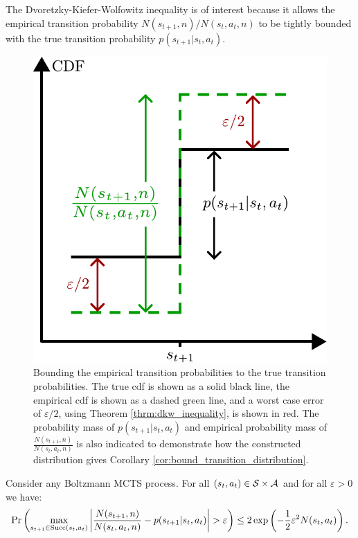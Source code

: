     The Dvoretzky-Kiefer-Wolfowitz inequality is of interest because it allows the empirical transition probability $N(s_{t+1},n)/N(s_t,a_t,n)$ to be tightly bounded with the true transition probability $p(s_{t+1}|s_t,a_t)$. 
    \begin{figure}
        \centering
        \includegraphics[scale=0.6]{figures/ch4/dkw_diagram.pdf}
        \caption[Bounding the empirical transition probabilities to the true transition probabilities.]{Bounding the empirical transition probabilities to the true transition probabilities. The true cdf is shown as a solid black line, the empirical cdf is shown as a dashed green line, and a worst case error of $\varepsilon/2$, using Theorem \ref{thrm:dkw_inequality}, is shown in red. The probability mass of $p(s_{t+1}|s_t,a_t)$ and empirical probability mass of $\frac{N(s_{t+1},n)}{N(s_t,a_t,n)}$ is also indicated to demonstrate how the constructed distribution gives Corollary \ref{cor:bound_transition_distribution}.}
        \label{fig:dkw_diag}
    \end{figure}
    \begin{corollary} \label{cor:bound_transition_distribution}
        Consider any Boltzmann MCTS process. For all $(s_t,a_t)\in\mathcal{S}\times\mathcal{A}$ and for all $\varepsilon >0$ we have:
        \begin{align}
            \Pr\left(\max_{s_{t+1}\in{\textnormal{Succ}(s_t,a_t)}}\left| \frac{N(s_{t+1},n)}{N(s_t,a_t,n)} - p(s_{t+1}|s_t,a_t) \right| > \varepsilon \right) \leq 2 \exp\left(-\frac{1}{2}\varepsilon^2 N(s_t,a_t) \right).
        \end{align}
    \end{corollary}
